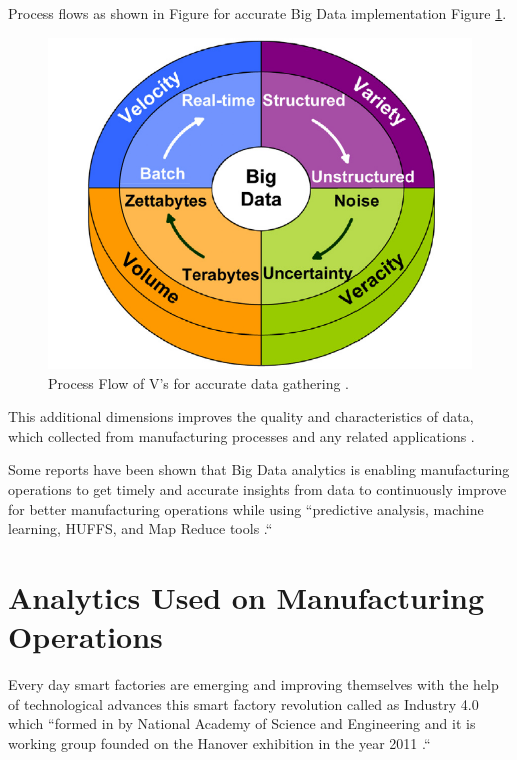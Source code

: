 \documentclass[sigconf]{acmart}
\begin{document}
\par Process flows as shown in Figure for accurate Big Data implementation Figure \ref{fig:5V}.  

 \begin{figure}[!ht]
  \centering
      \includegraphics[width=\columnwidth]{images/5V.png}
  \caption{Process Flow of V's for accurate data gathering \cite{HE2017}.}\label{fig:5V}
\end{figure}
    
\par This additional dimensions improves the quality and characteristics of data, which collected from manufacturing processes and any related applications \cite{BABICEANU2016128}.
\par Some reports have been shown that Big Data analytics is enabling manufacturing operations to get timely and accurate insights from data to continuously improve for better manufacturing operations while using ``predictive analysis, machine learning, HUFFS, and Map Reduce tools \cite{BABICEANU2016128}.``  


\section{Analytics Used on Manufacturing Operations}

 Every day smart factories are emerging and improving themselves with the help of technological advances this smart factory revolution called as Industry 4.0 which ``formed in by National Academy of Science and Engineering and it is working group founded on the Hanover exhibition in the year 2011 \cite{WAGNER2017125}.`` 
\end{document}

